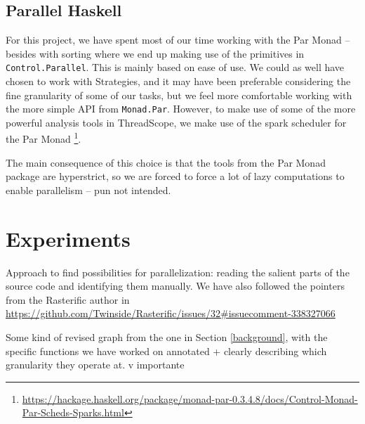 \documentclass[12pt, a4paper]{article}
\begin{document}
\subsection{Parallel Haskell}
For this project, we have spent most of our time working with the Par Monad -- besides with sorting where we end up making use of the primitives in \texttt{Control.Parallel}.
 This is mainly based on ease of use. We could as well have chosen to work with Strategies, and it may
have been preferable considering the fine granularity of some of our tasks, but we feel more comfortable working with the more simple API from \texttt{Monad.Par}.
However, to make use of some of the more powerful analysis tools in ThreadScope, we make use of the spark scheduler for the Par Monad
\footnote{\url{https://hackage.haskell.org/package/monad-par-0.3.4.8/docs/Control-Monad-Par-Scheds-Sparks.html}}.

The main consequence of this choice is that the tools from the Par Monad package are hyperstrict, so we are forced to force a lot of lazy computations to enable parallelism -- pun not intended.




\section{Experiments}\label{experiments}

Approach to find possibilities for parallelization: reading the salient parts of the source code and identifying them manually. We have also followed the pointers from the Rasterific author in \url{https://github.com/Twinside/Rasterific/issues/32#issuecomment-338327066}

Some kind of revised graph from the one in Section \ref{background}, with the specific functions we have worked on annotated + clearly describing which granularity they operate at. v importante
\end{document}

